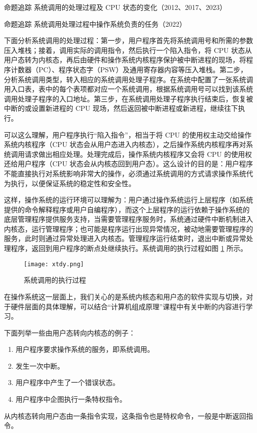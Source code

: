 \documentclass{ctexbook}
\begin{document}
	\colorbox{gray!20}{命题追踪 \enspace 系统调用的处理过程及 CPU 状态的变化（2012、2017、2023）}
	
	\colorbox{gray!20}{命题追踪 \enspace 系统调用处理过程中操作系统负责的任务（2022）}
	
	下面分析系统调用的处理过程：第一步，用户程序首先将系统调用号和所需的参数压入堆栈；接着，调用实际的调用指令，然后执行一个陷入指令，将 CPU 状态从用户态转为内核态，再后由硬件和操作系统内核程序保护被中断进程的现场，将程序计数器（PC）、程序状态字（PSW）及通用寄存器内容等压入堆栈。第二步，分析系统调用类型，转入相应的系统调用处理子程序。在系统中配置了一张系统调用入口表，表中的每个表项都对应一个系统调用，根据系统调用号可以找到该系统调用处理子程序的入口地址。第三步，在系统调用处理子程序执行结束后，恢复被中断的或设置新进程的 CPU 现场，然后返回被中断进程或新进程，继续往下执行。
	
	可以这么理解，用户程序执行“陷入指令”，相当于将 CPU 的使用权主动交给操作系统内核程序（CPU 状态会从用户态进入内核态），之后操作系统内核程序再对系统调用请求做出相应处理。处理完成后，操作系统内核程序又会将 CPU 的使用权还给用户程序（CPU 状态会从内核态回到用户态）。这么设计的目的是：用户程序不能直接执行对系统影响非常大的操作，必须通过系统调用的方式请求操作系统代为执行，以便保证系统的稳定性和安全性。
	
	这样，操作系统的运行环境可以理解为：用户通过操作系统运行上层程序（如系统提供的命令解释程序或用户自编程序），而这个上层程序的运行依赖于操作系统的底层管理程序提供服务支持，当需要管理程序服务时，系统通过硬件中断机制进入内核态，运行管理程序；也可能是程序运行出现异常情况，被动地需要管理程序的服务，此时则通过异常处理进入内核态。管理程序运行结束时，退出中断或异常处理程序，返回到用户程序的断点处继续执行。系统调用的执行过程如图 \ref{fig:tt} 所示。
	
	\begin{figure}[h]
		\centering
		\centering
		\label{fig:tt}
		\texttt{[image: xtdy.png]}
		\caption{系统调用的执行过程}
	\end{figure}
	
	在操作系统这一层面上，我们关心的是系统内核态和用户态的软件实现与切换，对于硬件层面的具体理解，可以结合“计算机组成原理”课程中有关中断的内容进行学习。
	
	下面列举一些由用户态转向内核态的例子：
	\begin{enumerate}
		\item 用户程序要求操作系统的服务，即系统调用。
		\item 发生一次中断。
		\item 用户程序中产生了一个错误状态。
		\item 用户程序中企图执行一条特权指令。
	\end{enumerate}
	从内核态转向用户态由一条指令实现，这条指令也是特权命令，一般是中断返回指令。
	
\end{document}
